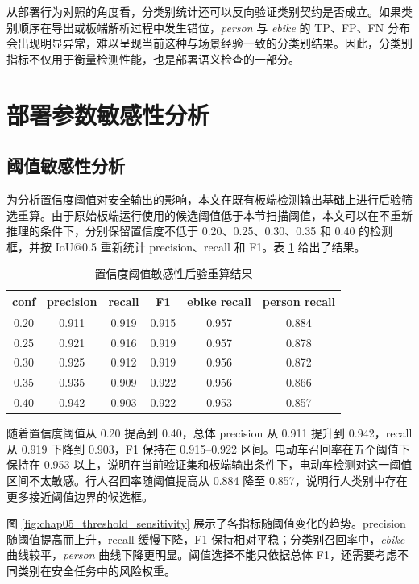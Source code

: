 从部署行为对照的角度看，分类别统计还可以反向验证类别契约是否成立。如果类别顺序在导出或板端解析过程中发生错位，\textit{person} 与 \textit{ebike} 的 TP、FP、FN 分布会出现明显异常，难以呈现当前这种与场景经验一致的分类别结果。因此，分类别指标不仅用于衡量检测性能，也是部署语义检查的一部分。

\section{部署参数敏感性分析}

\subsection{阈值敏感性分析}

为分析置信度阈值对安全输出的影响，本文在既有板端检测输出基础上进行后验筛选重算。由于原始板端运行使用的候选阈值低于本节扫描阈值，本文可以在不重新推理的条件下，分别保留置信度不低于 0.20、0.25、0.30、0.35 和 0.40 的检测框，并按 IoU@0.5 重新统计 precision、recall 和 F1。表 \ref{tab:threshold_sensitivity_results} 给出了结果。

\begin{table}[htbp]
    \centering
    \caption{置信度阈值敏感性后验重算结果}
    \label{tab:threshold_sensitivity_results}
    \begin{tabular}{cccccc}
        \toprule
        conf & precision & recall & F1 & ebike recall & person recall \\
        \midrule
        0.20 & 0.911 & 0.919 & 0.915 & 0.957 & 0.884 \\
        0.25 & 0.921 & 0.916 & 0.919 & 0.957 & 0.878 \\
        0.30 & 0.925 & 0.912 & 0.919 & 0.956 & 0.872 \\
        0.35 & 0.935 & 0.909 & 0.922 & 0.956 & 0.866 \\
        0.40 & 0.942 & 0.903 & 0.922 & 0.953 & 0.857 \\
        \bottomrule
    \end{tabular}
\end{table}

随着置信度阈值从 0.20 提高到 0.40，总体 precision 从 0.911 提升到 0.942，recall 从 0.919 下降到 0.903，F1 保持在 0.915--0.922 区间。电动车召回率在五个阈值下保持在 0.953 以上，说明在当前验证集和板端输出条件下，电动车检测对这一阈值区间不太敏感。行人召回率随阈值提高从 0.884 降至 0.857，说明行人类别中存在更多接近阈值边界的候选框。

图 \ref{fig:chap05_threshold_sensitivity} 展示了各指标随阈值变化的趋势。precision 随阈值提高而上升，recall 缓慢下降，F1 保持相对平稳；分类别召回率中，\textit{ebike} 曲线较平，\textit{person} 曲线下降更明显。阈值选择不能只依据总体 F1，还需要考虑不同类别在安全任务中的风险权重。

